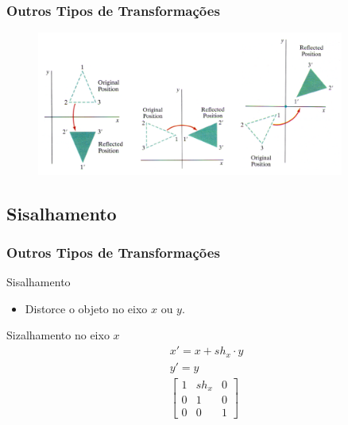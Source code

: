 \documentclass{beamer}
\begin{document}
\begin{frame}
\frametitle{Outros Tipos de Transformações}

	\begin{figure}[!h]
		\begin{center}
			\includegraphics[width=0.9\textwidth]{Figures/reflexo}
		\end{center}
	\end{figure}
		
\end{frame}	


\subsection{Sisalhamento}
\begin{frame}
\frametitle{Outros Tipos de Transformações}
	\begin{block}{Sisalhamento}
		\begin{itemize}
			\item Distorce o objeto no eixo $x$ ou $y$.
			
		\end{itemize}
	\end{block}
	
	\begin{block}{Sizalhamento no eixo $x$}
		\begin{eqnarray*}
			x' = x + sh_x \cdot y \\
			y' = y \\
			\begin{bmatrix}
				1 & sh_x & 0 \\
				0 & 1 & 0 \\
				0 & 0 & 1 
			\end{bmatrix}
		\end{eqnarray*}
	\end{block}	
	
\end{frame}	
\end{document}

